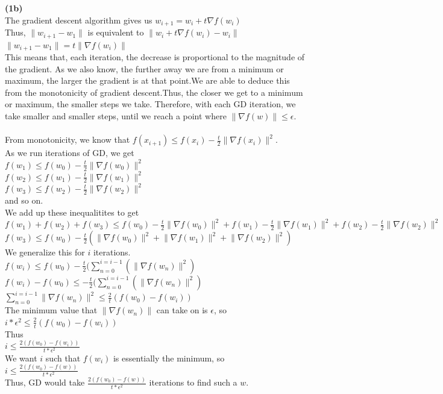 \documentclass[12pt, letterpaper]{article}
\begin{document}
\newpage
\noindent \large{\textbf{(1b)} } \\
The gradient descent algorithm gives us $w_{i+1}=w_i+t\nabla f(w_i)$\\
Thus, $\lVert w_{i+1}-w_1\rVert$ is equivalent to $\lVert w_i+t\nabla f(w_i)-w_i\rVert$\\
$\lVert w_{i+1}-w_1\rVert = t\lVert \nabla f(w_i)\rVert$\\
This means that, each iteration, the decrease is proportional to the magnitude of the gradient. As we also know, the further away we are from a minimum or maximum, the larger the gradient is at that point.We are able to deduce this from the monotonicity of gradient descent.Thus, the closer we get to a minimum or maximum, the smaller steps we take. Therefore, with each GD iteration, we take smaller and smaller steps, until we reach a point where $\lVert \nabla f(w)\rVert \leq \epsilon$. \\
\\
From monotonicity, we know that $f(x_{i+1})\leq f(x_i)-\frac{t}{2}\lVert \nabla f(x_i)\rVert^2$.\\
As we run iterations of GD, we get\\
$f(w_1)\leq f(w_0)-\frac{t}{2}\lVert \nabla f(w_0)\rVert^2$\\
$f(w_2)\leq f(w_1)-\frac{t}{2}\lVert \nabla f(w_1)\rVert^2$\\
$f(w_3)\leq f(w_2)-\frac{t}{2}\lVert \nabla f(w_2)\rVert^2$\\
and so on.\\
We add up these inequalitites to get\\
$f(w_1)+f(w_2)+f(w_3)\leq f(w_0)-\frac{t}{2}\lVert \nabla f(w_0)\rVert^2+f(w_1)-\frac{t}{2}\lVert \nabla f(w_1)\rVert^2+f(w_2)-\frac{t}{2}\lVert \nabla f(w_2)\rVert^2$\\
$f(w_3)\leq f(w_0)-\frac{t}{2}(\lVert \nabla f(w_0)\rVert^2+\lVert \nabla f(w_1)\rVert^2+\lVert \nabla f(w_2)\rVert^2)$\\
We generalize this for $i$ iterations.\\
$f(w_i)\leq f(w_0)-\frac{t}{2}(\sum_{n=0}^{i=i-1} (\lVert \nabla f(w_n)\rVert^2)$\\
$f(w_i)-f(w_0)\leq -\frac{t}{2}(\sum_{n=0}^{i=i-1} (\lVert \nabla f(w_n)\rVert^2)$\\
$\sum_{n=0}^{i=i-1} \lVert \nabla f(w_n)\rVert^2\leq \frac{2}{t}(f(w_0)-f(w_i))$\\
The minimum value that $\lVert \nabla f(w_n)\rVert$ can take on is $\epsilon$, so\\
$i*\epsilon^2\leq \frac{2}{t}(f(w_0)-f(w_i))$\\
Thus\\
$i\leq \frac{2(f(w_0)-f(w_i))}{t*\epsilon^2}$\\
We want $i$ such that $f(w_i)$ is essentially the minimum, so\\
$i\leq \frac{2(f(w_0)-f(w))}{t*\epsilon^2}$\\
Thus, GD would take $\frac{2(f(w_0)-f(w))}{t*\epsilon^2}$ iterations to find such a $w$.
\end{document}
